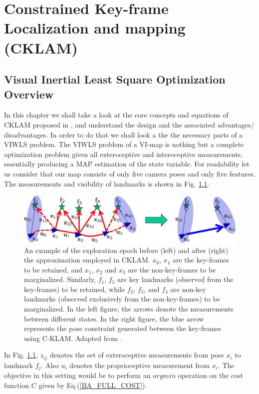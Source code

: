 \chapter{Constrained Key-frame Localization and mapping (CKLAM)}
\label{sec:CKLAM}
\section{Visual Inertial Least Square Optimization Overview}
In this chapter we shall take a look at the core concepts and equations of CKLAM proposed in \cite{CKLAM}, and understand the design and the associated advantages/ disadvantages. In order to do that we shall look a the the necessary parts of a VIWLS problem. 
The VIWLS problem of a VI-map is nothing but a complete optimization problem given all exteroceptive and interoceptive measurements, essentially producing a MAP estimation of the state variable. For readability let us consider that our map consists of only five camera poses and only five features. The measurements and visibility of landmarks is shown in Fig. \ref{fig:CKLAM_BLOCK}. 

\begin{figure}[ht]
	\centering
		\includegraphics[width=1.00\textwidth]{images/cklam_block.png}
		\caption{An example of the exploration epoch before (left) and after (right) the approximation employed in CKLAM. $x_0$, $x_4$ are the key-frames to be retained, and $x_1$, $x_2$ and $x_3$ are the non-key-frames to be marginalized. Similarly, $f_1$, $f_5$ are key landmarks (observed from the key-frames) to be retained, while $f_2$, $f_5$, and $f_4$ are non-key landmarks (observed exclusively from the non-key-frames) to be marginalized. In the left figure, the arrows denote the measurements between different states. In the right figure, the blue arrow represents the pose constraint generated between the key-frames using C-KLAM. Adapted from \cite{CKLAM}. }
	\label{fig:CKLAM_BLOCK}
\end{figure}

In Fig. \ref{fig:CKLAM_BLOCK}, $z_{ij}$ denotes the set of exteroceptive measurements from pose $x_i$ to landmark $f_j$. Also $u_i$ denotes the proprioceptive measurement from $x_i$. The objective in this setting would be to perform an $argmin$ operation on the cost function $C$ given by Eq.(\ref{BA_FULL_COST}). 

